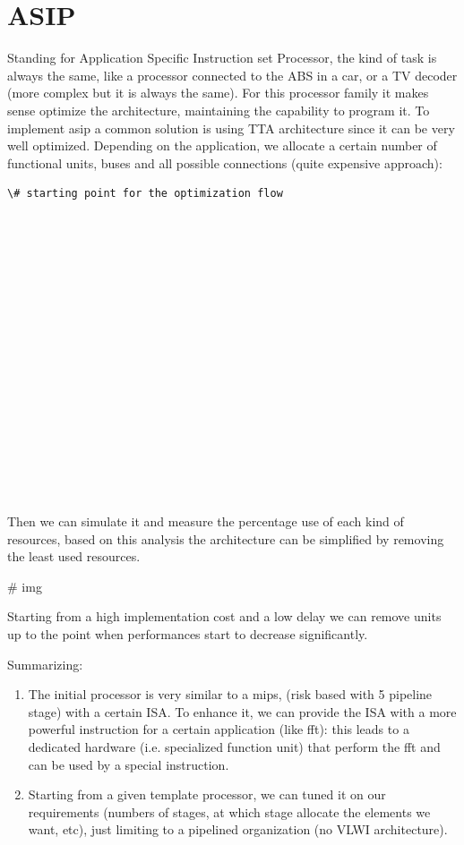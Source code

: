 \section{ASIP}
Standing for Application Specific Instruction set Processor, the kind of task is always the same, like a processor connected to the ABS in a car, or a TV decoder (more complex but it is always the same). For this processor family it makes sense optimize the architecture, maintaining the capability to program it.
To implement asip a common solution is using TTA architecture since it can be very well optimized.
Depending on the application, we allocate a certain number of functional units, buses and all possible connections (quite expensive approach):
\begin{verbatim}
\# starting point for the optimization flow


















\end{verbatim}
Then we can simulate it and measure the percentage use of each kind of resources, based on this analysis the architecture can be simplified by removing the least used resources.

\# img

Starting from a high implementation cost and a low delay we can remove units up to the point when performances start to decrease significantly.

Summarizing:

\begin{enumerate}
  \item The initial processor is very similar to a mips, (risk based with 5 pipeline stage) with a certain ISA. To enhance it, we can provide the ISA with a more powerful instruction for a certain application (like fft): this leads to a dedicated hardware (i.e. specialized function unit) that perform the fft and can be used by a special instruction.

  \item Starting from a given template processor, we can tuned it on our requirements (numbers of stages, at which stage allocate the elements we want, etc), just limiting to a pipelined organization (no VLWI architecture).
\end{enumerate}

